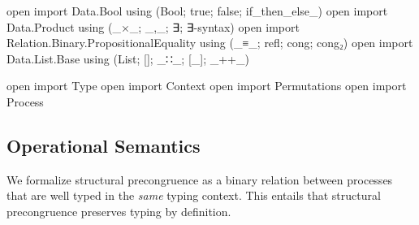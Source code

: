 \begin{code}[hide]
open import Data.Bool using (Bool; true; false; if_then_else_)
open import Data.Product using (_×_; _,_; ∃; ∃-syntax)
open import Relation.Binary.PropositionalEquality using (_≡_; refl; cong; cong₂)
open import Data.List.Base using (List; []; _∷_; [_]; _++_)

open import Type
open import Context
open import Permutations
open import Process
\end{code}

\subsection{Operational Semantics}
\label{sec:semantics-agda}

We formalize structural precongruence as a binary relation between processes
that are well typed in the \emph{same} typing context. This entails that
structural precongruence preserves typing by definition.

